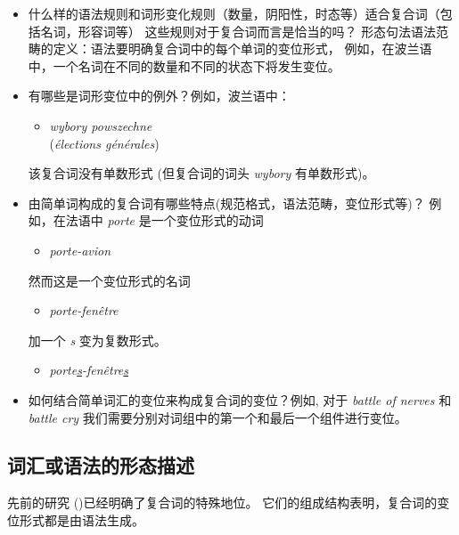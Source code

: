 \begin{itemize}
\item 什么样的语法规则和词形变化规则（数量，阴阳性，时态等）适合复合词（包括名词，形容词等）
这些规则对于复合词而言是恰当的吗？
\cite{PrzepWol03} 形态句法语法范畴的定义：语法要明确复合词中的每个单词的变位形式，
例如，在波兰语中，一个名词在不同的数量和不同的状态下将发生变位。

\item 有哪些是词形变位中的例外？例如，波兰语中：

\begin{itemize}
\item \emph{wybory powszechne}\\
	(\emph{élections générales}) 
\end{itemize}

该复合词没有单数形式 (但复合词的词头 \emph{wybory} 有单数形式)。

\item 由简单词构成的复合词有哪些特点(规范格式，语法范畴，变位形式等)？
例如，在法语中
\emph{porte} 是一个变位形式的动词

\begin{itemize}
\item \emph{porte-avion}
\end{itemize}

然而这是一个变位形式的名词
 
\begin{itemize}
\item \emph{porte-fenêtre}
\end{itemize}

加一个 \emph{s} 变为复数形式。

\begin{itemize}
\item \emph{porte\underline{s}-fenêtre\underline{s}}
\end{itemize}

\item 如何结合简单词汇的变位来构成复合词的变位？例如, 对于 \emph{battle of nerves} 和 \emph{battle cry} 我们需要分别对词组中的第一个和最后一个组件进行变位。
\end{itemize}

\subsection{词汇或语法的形态描述}
先前的研究 (\cite{these-Savary})已经明确了复合词的特殊地位。
它们的组成结构表明，复合词的变位形式都是由语法生成。 

